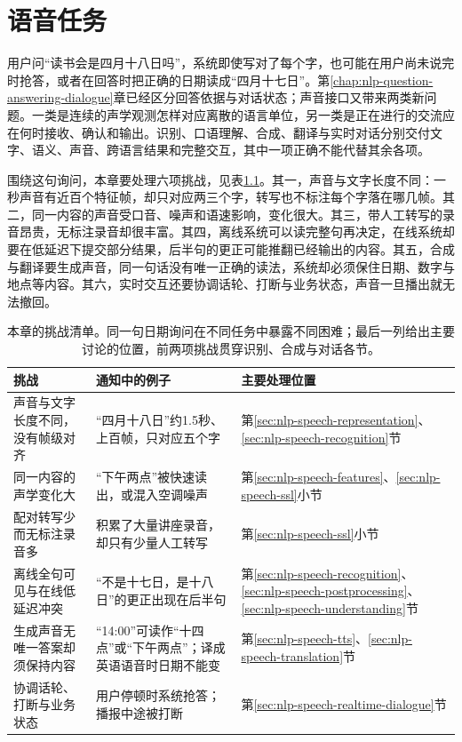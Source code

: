 \chapter{语音任务}
\label{chap:nlp-speech-tasks}

用户问“读书会是四月十八日吗”，系统即使写对了每个字，也可能在用户尚未说完时抢答，或者在回答时把正确的日期读成“四月十七日”。第\ref{chap:nlp-question-answering-dialogue}章已经区分回答依据与对话状态；声音接口又带来两类新问题。一类是连续的声学观测怎样对应离散的语言单位，另一类是正在进行的交流应在何时接收、确认和输出。识别、口语理解、合成、翻译与实时对话分别交付文字、语义、声音、跨语言结果和完整交互，其中一项正确不能代替其余各项。

围绕这句询问，本章要处理六项挑战，见表\ref{tab:nlp-speech-challenges}。其一，声音与文字长度不同：一秒声音有近百个特征帧，却只对应两三个字，转写也不标注每个字落在哪几帧。其二，同一内容的声音受口音、噪声和语速影响，变化很大。其三，带人工转写的录音昂贵，无标注录音却很丰富。其四，离线系统可以读完整句再决定，在线系统却要在低延迟下提交部分结果，后半句的更正可能推翻已经输出的内容。其五，合成与翻译要生成声音，同一句话没有唯一正确的读法，系统却必须保住日期、数字与地点等内容。其六，实时交互还要协调话轮、打断与业务状态，声音一旦播出就无法撤回。

\begin{table}[htbp]
  \centering
  \small
  \begin{tabularx}{\linewidth}{@{}>{\raggedright\arraybackslash}p{40mm}
    >{\raggedright\arraybackslash}X>{\raggedright\arraybackslash}p{34mm}@{}}
    \toprule
    挑战 & 通知中的例子 & 主要处理位置\\
    \midrule
    声音与文字长度不同，没有帧级对齐 & “四月十八日”约1.5秒、上百帧，只对应五个字 & 第\ref{sec:nlp-speech-representation}、\ref{sec:nlp-speech-recognition}节\\
    同一内容的声学变化大 & “下午两点”被快速读出，或混入空调噪声 & 第\ref{sec:nlp-speech-features}、\ref{sec:nlp-speech-ssl}小节\\
    配对转写少而无标注录音多 & 积累了大量讲座录音，却只有少量人工转写 & 第\ref{sec:nlp-speech-ssl}小节\\
    离线全句可见与在线低延迟冲突 & “不是十七日，是十八日”的更正出现在后半句 & 第\ref{sec:nlp-speech-recognition}、\ref{sec:nlp-speech-postprocessing}、\ref{sec:nlp-speech-understanding}节\\
    生成声音无唯一答案却须保持内容 & “14:00”可读作“十四点”或“下午两点”；译成英语语音时日期不能变 & 第\ref{sec:nlp-speech-tts}、\ref{sec:nlp-speech-translation}节\\
    协调话轮、打断与业务状态 & 用户停顿时系统抢答；播报中途被打断 & 第\ref{sec:nlp-speech-realtime-dialogue}节\\
    \bottomrule
  \end{tabularx}
  \caption{本章的挑战清单。同一句日期询问在不同任务中暴露不同困难；最后一列给出主要讨论的位置，前两项挑战贯穿识别、合成与对话各节。}
  \label{tab:nlp-speech-challenges}
\end{table}

